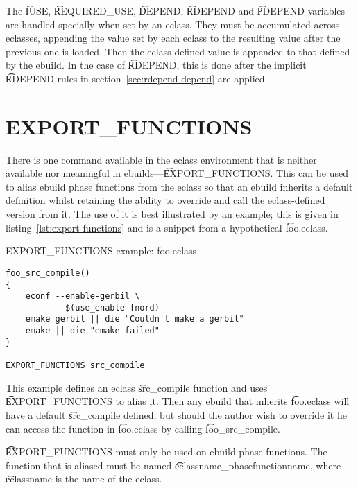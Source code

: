 The \t{IUSE}, \t{REQUIRED\_USE}, \t{DEPEND}, \t{RDEPEND} and \t{PDEPEND} variables are handled
specially when set by an eclass. They must be accumulated across eclasses, appending the value set
by each eclass to the resulting value after the previous one is loaded. Then the eclass-defined
value is appended to that defined by the ebuild. In the case of \t{RDEPEND}, this is done after the
implicit \t{RDEPEND} rules in section~\ref{sec:rdepend-depend} are applied.

\section{EXPORT\_FUNCTIONS}

There is one command available in the eclass environment that is neither available nor meaningful
in ebuilds---\t{EXPORT\_FUNCTIONS}\@. This can be used to alias ebuild phase functions from the
eclass so that an ebuild inherits a default definition whilst retaining the ability to override and
call the eclass-defined version from it. The use of it is best illustrated by an example; this is
given in listing~\ref{lst:export-functions} and is a snippet from a hypothetical \t{foo.eclass}.

\begin{listing}
\caption{EXPORT\_FUNCTIONS example: foo.eclass} \label{lst:export-functions}
\begin{verbatim}
foo_src_compile()
{
    econf --enable-gerbil \
            $(use_enable fnord)
    emake gerbil || die "Couldn't make a gerbil"
    emake || die "emake failed"
}

EXPORT_FUNCTIONS src_compile
\end{verbatim}
\end{listing}

This example defines an eclass \t{src\_compile} function and uses \t{EXPORT\_FUNCTIONS} to alias
it. Then any ebuild that inherits \t{foo.eclass} will have a default \t{src\_compile} defined, but
should the author wish to override it he can access the function in \t{foo.eclass} by calling
\t{foo\_src\_compile}.

\t{EXPORT\_FUNCTIONS} must only be used on ebuild phase functions. The function that is aliased
must be named \t{eclassname\_phasefunctionname}, where \t{eclassname} is the name of the eclass.


